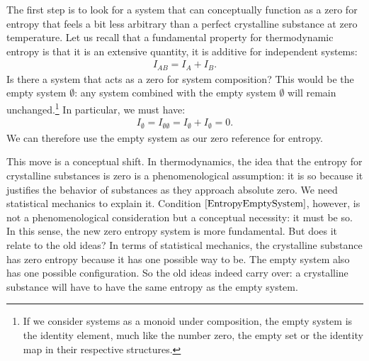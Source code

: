 \documentclass[10pt,twocolumn, nofootinbib]{revtex4-2}
\begin{document}
The first step is to look for a system that can conceptually function as a zero for entropy that feels a bit less arbitrary than a perfect crystalline substance at zero temperature. Let us recall that a fundamental property for thermodynamic entropy is that it is an extensive quantity, it is additive for independent systems:
\begin{align}
	I_{AB} = I_{A} + I_{B}.
\end{align}
Is there a system that acts as a zero for system composition? This would be the empty system $\emptyset$: any system combined with the empty system $\emptyset$ will remain unchanged.\footnote{If we consider systems as a monoid under composition, the empty system is the identity element, much like the number zero, the empty set or the identity map in their respective structures.} In particular, we must have:
\begin{align}\label{EntropyEmptySystem}
	I_{\emptyset} = I_{\emptyset\emptyset} = I_{\emptyset} + I_{\emptyset} = 0.
\end{align}
We can therefore use the empty system as our zero reference for entropy.

This move is a conceptual shift. In thermodynamics, the idea that the entropy for crystalline substances is zero is a phenomenological assumption: it is so because it justifies the behavior of substances as they approach absolute zero. We need statistical mechanics to explain it. Condition $\eqref{EntropyEmptySystem}$, however, is not a phenomenological consideration but a conceptual necessity: it must be so. In this sense, the new zero entropy system is more fundamental. But does it relate to the old ideas? In terms of statistical mechanics, the crystalline substance has zero entropy because it has one possible way to be. The empty system also has one possible configuration. So the old ideas indeed carry over: a crystalline substance will have to have the same entropy as the empty system.
\end{document}
